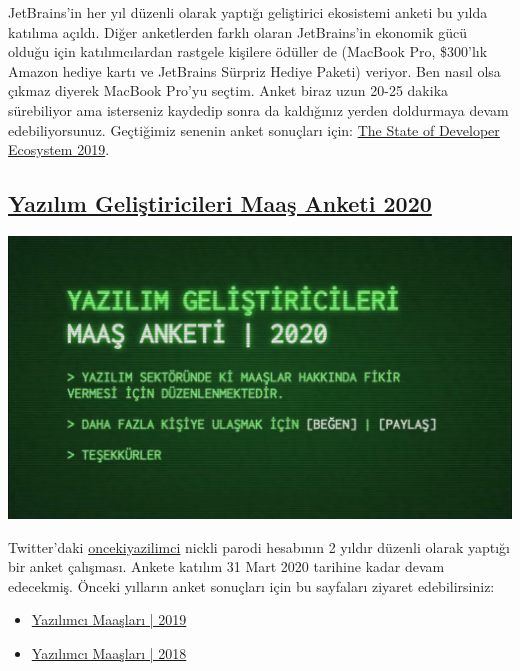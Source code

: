 \documentclass[11pt]{article}
\begin{document}
JetBrains'in her yıl düzenli olarak yaptığı geliştirici ekosistemi anketi bu
yılda katılıma açıldı. Diğer anketlerden farklı olaran JetBrains'in ekonomik
gücü olduğu için katılımcılardan rastgele kişilere ödüller de (MacBook Pro,
\$300'lık Amazon hediye kartı ve JetBrains Sürpriz Hediye Paketi) veriyor. Ben
nasıl olsa çıkmaz diyerek MacBook Pro'yu seçtim. Anket biraz uzun 20-25
dakika sürebiliyor ama isterseniz kaydedip sonra da kaldığınız yerden
doldurmaya devam edebiliyorsunuz. Geçtiğimiz senenin anket sonuçları için:
\href{https://www.jetbrains.com/lp/devecosystem-2019/}{The State of Developer Ecosystem 2019}.
\subsection{\href{https://docs.google.com/forms/d/e/1FAIpQLSf-DvTpaz4oSPDMghdpHutdoY1Pn\_YqVa8JRLV2tPIiQcM3BA/viewform}{Yazılım Geliştiricileri Maaş Anketi 2020}}
\label{sec:orgedb69be}
\begin{center}
\includegraphics[width=.9\linewidth]{gorseller/yazilim-gelistirici-maas-anketi.png}
\end{center}

Twitter'daki \href{https://twitter.com/oncekiyazilimci}{oncekiyazilimci} nickli parodi hesabının 2 yıldır düzenli olarak
yaptığı bir anket çalışması. Ankete katılım 31 Mart 2020 tarihine kadar devam
edecekmiş. Önceki yılların anket sonuçları için bu sayfaları ziyaret
edebilirsiniz:
\begin{itemize}
\item \href{https://medium.com/@oncekiyazilimci/yaz\%C4\%B1l\%C4\%B1mc\%C4\%B1-maa\%C5\%9Flar\%C4\%B1-2019-f0e535d736a3}{Yazılımcı Maaşları | 2019}
\item \href{https://medium.com/@oncekiyazilimci/yaz\%C4\%B1l\%C4\%B1mc\%C4\%B1-maa\%C5\%9Flar\%C4\%B1-c312a05df5a6}{Yazılımcı Maaşları | 2018}
\end{itemize}
\end{document}

